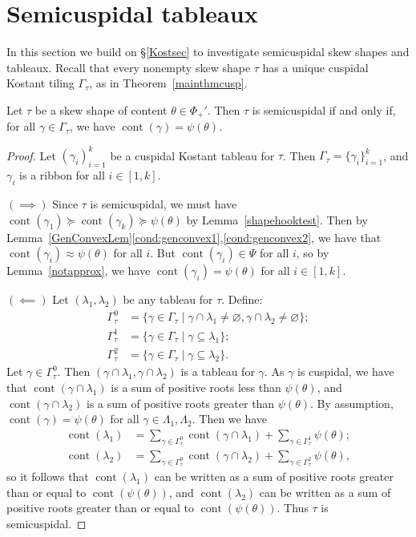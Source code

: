 \documentclass[Unicode,ALCO]{cedram}
\newcommand{\0}{{\bar 0}}
\def\cont{{\operatorname{cont}}}
\begin{document}
\section{Semicuspidal tableaux}\label{semicuspcons}
In this section we build on \S\ref{Kostsec} to investigate semicuspidal skew shapes and tableaux. Recall that every nonempty skew shape \(\tau\) has a unique cuspidal Kostant tiling \(\Gamma_\tau\), as in Theorem~\ref{mainthmcusp}.

\begin{lemma}\label{sciffcusptile}
Let \(\tau\) be a skew shape of content \(\theta \in \Phi_+'\). Then \(\tau\) is semicuspidal if and only if, for all \(\gamma \in \Gamma_\tau\), we have \(\cont(\gamma) = \psi(\theta)\).
\end{lemma}
\begin{proof}
Let \((\gamma_i)_{i=1}^k\) be a cuspidal Kostant tableau for \(\tau\). Then \(\Gamma_\tau = \{\gamma_i\}_{i=1}^k\), and \(\gamma_i\) is a ribbon for all \(i \in [1,k]\). 

\((\implies)\) Since \(\tau\) is semicuspidal, we must have \(\cont(\gamma_1) \succeq \cont(\gamma_k) \succeq \psi(\theta)\) by Lemma~\ref{shapehooktest}. Then by Lemma~\ref{GenConvexLem}\eqref{cond:genconvex1},\eqref{cond:genconvex2}, we have that \(\cont(\gamma_i) \approx \psi(\theta)\) for all \(i\). But \(\cont(\gamma_i) \in \Psi\) for all \(i\), so by Lemma~\ref{notapprox}, we have \(\cont(\gamma_i) = \psi(\theta)\) for all \(i \in [1,k]\). 

\((\impliedby)\) Let \((\lambda_1, \lambda_2)\) be any tableau for \(\tau\). Define:
\begin{align*}
\Gamma^0_\tau &= \{\gamma \in \Gamma_\tau \mid \gamma \cap \lambda_1 \neq \varnothing, \gamma\cap \lambda_2 \neq \varnothing\};\\
 \Gamma^1_\tau &= \{\gamma \in \Gamma_\tau \mid \gamma \subseteq \lambda_1\};\\
  \Gamma^2_\tau &= \{\gamma \in \Gamma_\tau \mid \gamma \subseteq \lambda_2\}.
  \end{align*}
Let \(\gamma \in \Gamma^0_\tau\). Then \((\gamma \cap \lambda_1, \gamma \cap \lambda_2)\) is a tableau for \(\gamma\). As \(\gamma\) is cuspidal, we have that \(\cont(\gamma \cap \lambda_1)\) is a sum of positive roots less than \(\psi(\theta)\), and \(\cont(\gamma \cap \lambda_2)\) is a sum of positive roots greater than \(\psi(\theta)\). By assumption, \(\cont(\gamma) = \psi(\theta)\) for all \(\gamma \in \Lambda_1, \Lambda_2\). Then we have
\begin{align*}
\cont(\lambda_1) &= \sum_{\gamma \in \Gamma_\tau^0} \cont(\gamma \cap \lambda_1) + \sum_{\gamma \in \Gamma^1_\tau} \psi(\theta);\\
\cont(\lambda_2) &= \sum_{\gamma \in \Gamma_\tau^0} \cont(\gamma \cap \lambda_2) + \sum_{\gamma \in \Gamma^2_\tau} \psi(\theta),
\end{align*}
so it follows that \(\cont(\lambda_1)\) can be written as a sum of positive roots greater than or equal to \(\cont(\psi(\theta))\), and \(\cont(\lambda_2)\) can be written as a sum of positive roots greater than or equal to \(\cont(\psi(\theta))\). Thus \(\tau\) is semicuspidal.
\end{proof}
\end{document}
